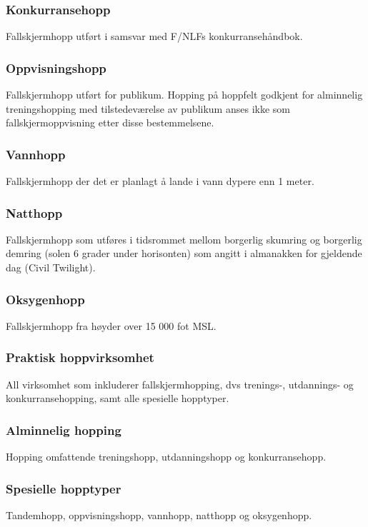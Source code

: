 \subsubsection{Konkurransehopp}
Fallskjermhopp utført i samsvar med F/NLFs konkurransehåndbok.

\subsubsection{Oppvisningshopp}
Fallskjermhopp utført for publikum. Hopping på hoppfelt godkjent for alminnelig treningshopping med tilstedeværelse av publikum anses ikke som fallskjermoppvisning etter disse bestemmelsene.

\subsubsection{Vannhopp}
Fallskjermhopp der det er planlagt å lande i vann dypere enn 1 meter.

\subsubsection{Natthopp}
Fallskjermhopp som utføres i tidsrommet mellom borgerlig skumring og borgerlig demring (solen 6 grader under horisonten) som angitt i almanakken for gjeldende dag (Civil Twilight).

\subsubsection{Oksygenhopp}
Fallskjermhopp fra høyder over 15 000 fot MSL.

\subsubsection{Praktisk hoppvirksomhet}
All virksomhet som inkluderer fallskjermhopping, dvs trenings-, utdannings- og konkurransehopping, samt alle spesielle hopptyper.

\subsubsection{Alminnelig hopping}
Hopping omfattende treningshopp, utdanningshopp og konkurransehopp.

\subsubsection{Spesielle hopptyper}
Tandemhopp, oppvisningshopp, vannhopp, natthopp og oksygenhopp.

